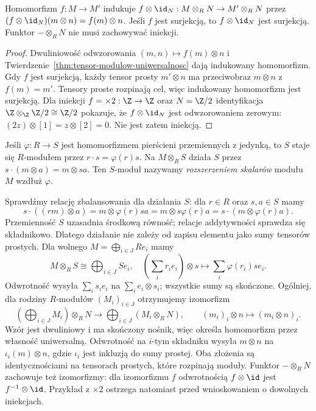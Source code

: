 \begin{stwierdzenie}
\label{prop:tensor-maps-algebra}
Homomorfizm $f:M\to M'$ indukuje
$f\otimes\id_N:M\otimes_R N\to M'\otimes_R N$
przez $(f\otimes\id_N)(m\otimes n)=f(m)\otimes n$.
Jeśli $f$ jest surjekcją, to $f\otimes\id_N$
jest surjekcją. Funktor $-\otimes_R N$ nie musi
zachowywać iniekcji.
\end{stwierdzenie}
\begin{proof}
Dwuliniowość odwzorowania $(m,n)\mapsto f(m)\otimes n$
i Twierdzenie~\ref{thm:tensor-modulow-uniwersalnosc}
dają indukowany homomorfizm.
Gdy $f$ jest surjekcją, każdy tensor prosty
$m'\otimes n$ ma przeciwobraz $m\otimes n$
z $f(m)=m'$. Tensory proste rozpinają cel,
więc indukowany homomorfizm jest surjekcją.
Dla iniekcji $f=\times2:\Z\to\Z$ oraz
$N=\Z/2$ identyfikacja
$\Z\otimes_{\Z}\Z/2\cong\Z/2$ pokazuje,
że $f\otimes\id_N$ jest odwzorowaniem zerowym:
$(2z)\otimes[1]=z\otimes[2]=0$.
Nie jest zatem iniekcją.
\end{proof}

\begin{definicja}
\label{def:rozszerzenie-skalarow}
Jeśli $\varphi:R\to S$ jest homomorfizmem
pierścieni przemiennych z jedynką, to $S$
staje się $R$-modułem przez $r\cdot s=\varphi(r)s$.
Na $M\otimes_R S$ działa $S$ przez
$s\cdot(m\otimes a)=m\otimes sa$.
Ten $S$-moduł nazywamy \emph{rozszerzeniem
skalarów} modułu $M$ wzdłuż $\varphi$.
\end{definicja}

Sprawdźmy relację zbalansowania dla działania
$S$: dla $r\in R$ oraz $s,a\in S$ mamy
\[
 s\cdot((rm)\otimes a)
 =m\otimes\varphi(r)sa
 =m\otimes s\varphi(r)a
 =s\cdot(m\otimes\varphi(r)a).
\]
Przemienność $S$ uzasadnia środkową równość;
relacje addytywności sprawdza się składnikowo.
Dlatego działanie nie zależy od zapisu elementu
jako sumy tensorów prostych. Dla wolnego
$M=\bigoplus_{i\in J}Re_i$ mamy
\[
 M\otimes_R S\cong\bigoplus_{i\in J}Se_i,
 \quad
 (\textstyle\sum_i r_i e_i)\otimes s
 \longmapsto\textstyle\sum_i\varphi(r_i)s e_i.
\]
Odwrotność wysyła $\sum_i s_i e_i$ na
$\sum_i e_i\otimes s_i$; wszystkie sumy są
skończone. Ogólniej, dla rodziny $R$-modułów $(M_i)_{i\in J}$
otrzymujemy izomorfizm
\[
 \left(\bigoplus_{i\in J}M_i\right)\otimes_R N
 \longrightarrow \bigoplus_{i\in J}(M_i\otimes_R N),
 \qquad (m_i)_i\otimes n\longmapsto(m_i\otimes n)_i.
\]
Wzór jest dwuliniowy i ma skończony nośnik, więc określa
homomorfizm przez własność uniwersalną. Odwrotność na
$i$-tym składniku wysyła $m\otimes n$ na $\iota_i(m)\otimes n$,
gdzie $\iota_i$ jest inkluzją do sumy prostej. Oba złożenia są
identycznościami na tensorach prostych, które rozpinają moduły.
Funktor $-\otimes_R N$ zachowuje też izomorfizmy: dla izomorfizmu $f$
odwrotnością $f\otimes\id$ jest $f^{-1}\otimes\id$.
Przykład z $\times2$ ostrzega natomiast przed
wnioskowaniem o dowolnych iniekcjach.

